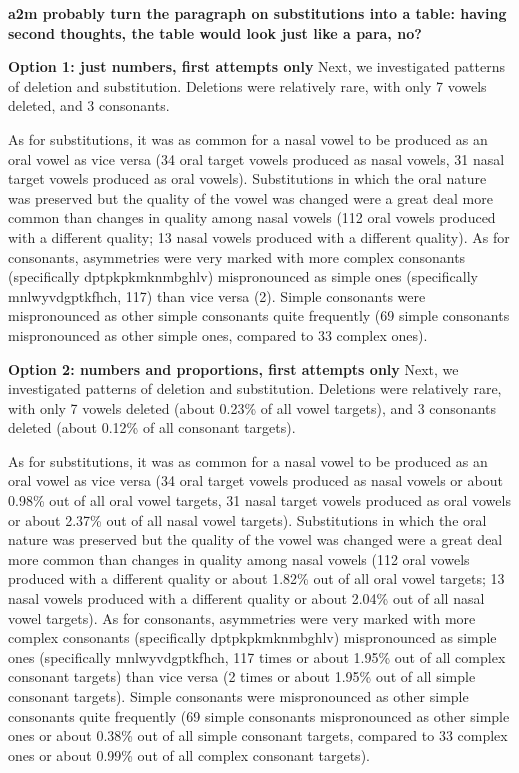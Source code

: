 \documentclass[english,,man,floatsintext]{apa6}
\begin{document}
\textbf{a2m probably turn the paragraph on substitutions into a table: having second thoughts, the table would look just like a para, no?}

\textbf{Option 1: just numbers, first attempts only }
Next, we investigated patterns of deletion and substitution. Deletions were relatively rare, with only 7 vowels deleted, and 3 consonants.

As for substitutions, it was as common for a nasal vowel to be produced as an oral vowel as vice versa (34 oral target vowels produced as nasal vowels, 31 nasal target vowels produced as oral vowels). Substitutions in which the oral nature was preserved but the quality of the vowel was changed were a great deal more common than changes in quality among nasal vowels (112 oral vowels produced with a different quality; 13 nasal vowels produced with a different quality). As for consonants, asymmetries were very marked with more complex consonants (specifically dptpkpkmknmbghlv) mispronounced as simple ones (specifically mnlwyvdgptkfhch, 117) than vice versa (2). Simple consonants were mispronounced as other simple consonants quite frequently (69 simple consonants mispronounced as other simple ones, compared to 33 complex ones).

\textbf{Option 2: numbers and proportions, first attempts only}
Next, we investigated patterns of deletion and substitution. Deletions were relatively rare, with only 7 vowels deleted (about 0.23\% of all vowel targets), and 3 consonants deleted (about 0.12\% of all consonant targets).

As for substitutions, it was as common for a nasal vowel to be produced as an oral vowel as vice versa (34 oral target vowels produced as nasal vowels or about 0.98\% out of all oral vowel targets, 31 nasal target vowels produced as oral vowels or about 2.37\% out of all nasal vowel targets). Substitutions in which the oral nature was preserved but the quality of the vowel was changed were a great deal more common than changes in quality among nasal vowels (112 oral vowels produced with a different quality or about 1.82\% out of all oral vowel targets; 13 nasal vowels produced with a different quality or about 2.04\% out of all nasal vowel targets). As for consonants, asymmetries were very marked with more complex consonants (specifically dptpkpkmknmbghlv) mispronounced as simple ones (specifically mnlwyvdgptkfhch, 117 times or about 1.95\% out of all complex consonant targets) than vice versa (2 times or about 1.95\% out of all simple consonant targets). Simple consonants were mispronounced as other simple consonants quite frequently (69 simple consonants mispronounced as other simple ones or about 0.38\% out of all simple consonant targets, compared to 33 complex ones or about 0.99\% out of all complex consonant targets).
\end{document}
